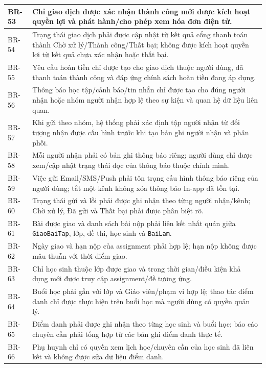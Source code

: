 \documentclass[12pt,a4paper,oneside]{report}
\begin{document}
\begin{longtable}{|p{1.6cm}|p{12.7cm}|}
BR-53 & Chỉ giao dịch được xác nhận thành công mới được kích hoạt quyền lợi và phát hành/cho phép xem hóa đơn điện tử. \\ \hline
BR-54 & Trạng thái giao dịch phải được cập nhật từ kết quả cổng thanh toán thành Chờ xử lý/Thành công/Thất bại; không được kích hoạt quyền lợi từ kết quả chưa xác nhận hoặc thất bại. \\ \hline
BR-55 & Yêu cầu hoàn tiền chỉ được tạo cho giao dịch thuộc người dùng, đã thanh toán thành công và đáp ứng chính sách hoàn tiền đang áp dụng. \\ \hline
BR-56 & Thông báo học tập/cảnh báo/tin nhắn chỉ được tạo cho đúng người nhận hoặc nhóm người nhận hợp lệ theo sự kiện và quan hệ dữ liệu liên quan. \\ \hline
BR-57 & Khi gửi theo nhóm, hệ thống phải xác định tập người nhận từ đối tượng nhận được cấu hình trước khi tạo bản ghi người nhận và phân phối. \\ \hline
BR-58 & Mỗi người nhận phải có bản ghi thông báo riêng; người dùng chỉ được xem/cập nhật trạng thái đọc của thông báo thuộc chính mình. \\ \hline
BR-59 & Việc gửi Email/SMS/Push phải tôn trọng cấu hình thông báo riêng của người dùng; tắt một kênh không xóa thông báo In-app đã tồn tại. \\ \hline
BR-60 & Trạng thái gửi và lỗi phải được ghi nhận theo từng người nhận/kênh; Chờ xử lý, Đã gửi và Thất bại phải được phân biệt rõ. \\ \hline
BR-61 & Bài được giao và danh sách bài nộp phải liên kết nhất quán giữa \texttt{GiaoBaiTap}, lớp, đề thi, học sinh và \texttt{BaiLam}. \\ \hline
BR-62 & Ngày giao và hạn nộp của assignment phải hợp lệ; hạn nộp không được mâu thuẫn với thời điểm giao. \\ \hline
BR-63 & Chỉ học sinh thuộc lớp được giao và trong thời gian/điều kiện khả dụng mới được truy cập assignment/đề tương ứng. \\ \hline
BR-64 & Buổi học phải gắn với lớp và Giáo viên/phạm vi hợp lệ; thao tác điểm danh chỉ được thực hiện trên buổi học mà người dùng có quyền quản lý. \\ \hline
BR-65 & Điểm danh phải được ghi nhận theo từng học sinh và buổi học; báo cáo chuyên cần phải tổng hợp từ các bản ghi điểm danh thực tế. \\ \hline
BR-66 & Phụ huynh chỉ có quyền xem lịch học/chuyên cần của học sinh đã liên kết và không được sửa dữ liệu điểm danh. \\ \hline

\end{longtable}
\end{document}
